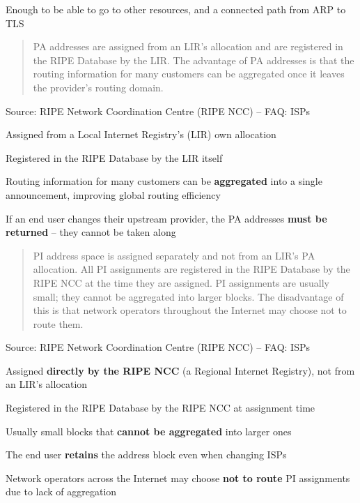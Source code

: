 \documentclass[Screen16to9,17pt]{foils}
\begin{document}
Enough to be able to go to other resources, and a connected path from ARP to TLS


\begin{quote}
PA addresses are assigned from an LIR's allocation and are registered in the RIPE Database
by the LIR. The advantage of PA addresses is that the routing information for many customers
can be aggregated once it leaves the provider's routing domain.
\end{quote}
Source: RIPE Network Coordination Centre (RIPE NCC) -- FAQ: ISPs\\

\begin{list2}
  \item Assigned from a Local Internet Registry's (LIR) own allocation
  \item Registered in the RIPE Database by the LIR itself
  \item Routing information for many customers can be {\bf aggregated} into a single
        announcement, improving global routing efficiency
  \item If an end user changes their upstream provider, the PA addresses
        {\bf must be returned} -- they cannot be taken along
\end{list2}


\begin{quote}
PI address space is assigned separately and not from an LIR's PA allocation. All PI
assignments are registered in the RIPE Database by the RIPE NCC at the time they are
assigned. PI assignments are usually small; they cannot be aggregated into larger blocks.
The disadvantage of this is that network operators throughout the Internet may choose
not to route them.
\end{quote}
Source: RIPE Network Coordination Centre (RIPE NCC) -- FAQ: ISPs\\

\begin{list2}
  \item Assigned {\bf directly by the RIPE NCC} (a Regional Internet Registry),
        not from an LIR's allocation
  \item Registered in the RIPE Database by the RIPE NCC at assignment time
  \item Usually small blocks that {\bf cannot be aggregated} into larger ones
  \item The end user {\bf retains} the address block even when changing ISPs
  \item Network operators across the Internet may choose {\bf not to route} PI
        assignments due to lack of aggregation
\end{list2}
\end{document}
